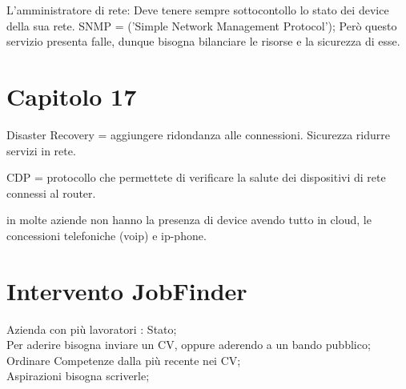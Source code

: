 \documentclass{article}
\begin{document}
L'amministratore di rete: Deve tenere sempre sottocontollo lo stato dei device della sua rete.
SNMP = ('Simple Network Management Protocol');
Però questo servizio presenta falle, dunque bisogna bilanciare le risorse e la sicurezza di esse.

\section{Capitolo 17}

Disaster Recovery = aggiungere ridondanza alle connessioni.
Sicurezza ridurre servizi in rete.

CDP = protocollo che permettete di verificare la salute dei dispositivi di rete connessi al router.

in molte aziende non hanno la presenza di device avendo tutto in cloud, le concessioni telefoniche (voip) e ip-phone.



\section{Intervento JobFinder}

Azienda con più lavoratori : Stato;\\
Per aderire bisogna inviare un CV, oppure aderendo a un bando pubblico;\\
Ordinare Competenze dalla più recente nei CV;\\
Aspirazioni bisogna scriverle;\\
\end{document}
